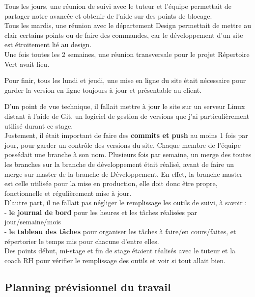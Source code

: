 Tous les jours, une réunion de suivi avec le tuteur et l'équipe permettait de partager notre avancée et obtenir de l'aide sur des points de blocage.\\

Tous les mardis, une réunion avec le département Design permettait de mettre au clair certains points ou de faire des commandes, car le développement d'un site est étroitement lié au design.\\

Une fois toutes les 2 semaines, une réunion transversale pour le projet Répertoire Vert avait lieu.

Pour finir, tous les lundi et jeudi, une mise en ligne du site était nécessaire pour garder la version en ligne toujours à jour et présentable au client.

D'un point de vue technique, il fallait mettre à jour le site sur un serveur Linux distant à l'aide de Git, un logiciel de gestion de versions que j'ai particulièrement utilisé durant ce stage. \\

Justement, il était important de faire des \textbf{commits et push} au moins 1 fois par jour, pour garder un contrôle des versions du site.
Chaque membre de l'équipe possédait une branche à son nom. Plusieurs fois par semaine, un merge des toutes les branches sur la branche de développement était réalisé, avant de faire un merge sur master de la branche de Développement.
En effet, la branche master est celle utilisée pour la mise en production, elle doit donc être propre, fonctionnelle et régulièrement mise à jour. \\

D'autre part, il ne fallait pas négliger le remplissage les outils de suivi, à savoir : \\
- \textbf{le journal de bord} pour les heures et les tâches réalisées par jour/semaine/mois\\ 
- \textbf{le tableau des tâches} pour organiser les tâches à faire/en cours/faites, et répertorier le temps mis pour chacune d'entre elles.\\

Des points début, mi-stage et fin de stage étaient réalisés avec le tuteur et la coach RH pour vérifier le remplissage des outils et voir si tout allait bien.


\pagebreak
\subsection{Planning prévisionnel du travail}

